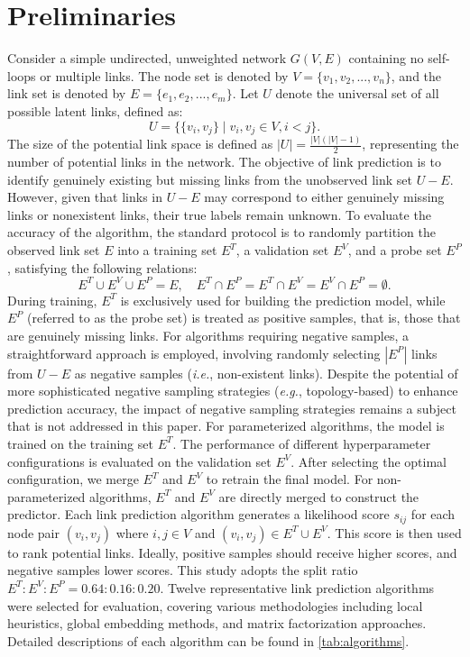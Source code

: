 \documentclass{article}
\begin{document}
\section{Preliminaries}
Consider a simple undirected, unweighted network $G(V, E)$ containing no self-loops or multiple links. The node set is denoted by $V = \{v_1, v_2, ..., v_n\}$, and the link set is denoted by $E = \{e_1, e_2, ..., e_m\}$. Let $U$ denote the universal set of all possible latent links, defined as: $$U=\{\{v_i, v_j\} \mid v_i, v_j \in V, i<j\}.$$
The size of the potential link space is defined as $|U|=\frac{|V|(|V|- 1)}{2}$, representing the number of potential links in the network. The objective of link prediction is to identify genuinely existing but missing links from the unobserved link set $U-E$. However, given that links in $U-E$ may correspond to either genuinely missing links or nonexistent links, their true labels remain unknown. To evaluate the accuracy of the algorithm, the standard protocol is to randomly partition the observed link set $E$ into a training set $E^T$, a validation set $E^V$, and a probe set $E^P$ \cite{jiao2025}, satisfying the following relations:
$$ E^T \cup E^V \cup E^P = E, \quad E^T \cap E^P = E^T \cap E^V = E^V \cap E^P = \emptyset. $$
During training, $E^T$ is exclusively used for building the prediction model, while $E^P$ (referred to as the probe set) is treated as positive samples, that is, those that are genuinely missing links. For algorithms requiring negative samples, a straightforward approach is employed, involving randomly selecting $|E^P|$ links from $U - E$ as negative samples (\textit{i.e.}, non-existent links). Despite the potential of more sophisticated negative sampling strategies (\textit{e.g.}, topology-based) to enhance prediction accuracy, the impact of negative sampling strategies remains a subject \cite{deng2025} that is not addressed in this paper.
For parameterized algorithms, the model is trained on the training set $E^T$. The performance of different hyperparameter configurations is evaluated on the validation set $E^V$. After selecting the optimal configuration, we merge $E^T$ and $E^V$ to retrain the final model. For non-parameterized algorithms, $E^T$ and $E^V$ are directly merged to construct the predictor. Each link prediction algorithm generates a likelihood score $s_{ij}$ for each node pair $(v_i, v_j)$ where $i,j \in V$ and $(v_i, v_j) \in E^T\cup E^V$. This score is then used to rank potential links. Ideally, positive samples should receive higher scores, and negative samples lower scores. This study adopts the split ratio $E^T : E^V : E^P = 0.64 : 0.16 : 0.20$. Twelve representative link prediction algorithms were selected for evaluation, covering various methodologies including local heuristics, global embedding methods, and matrix factorization approaches. Detailed descriptions of each algorithm can be found in \autoref{tab:algorithms}.
\end{document}
